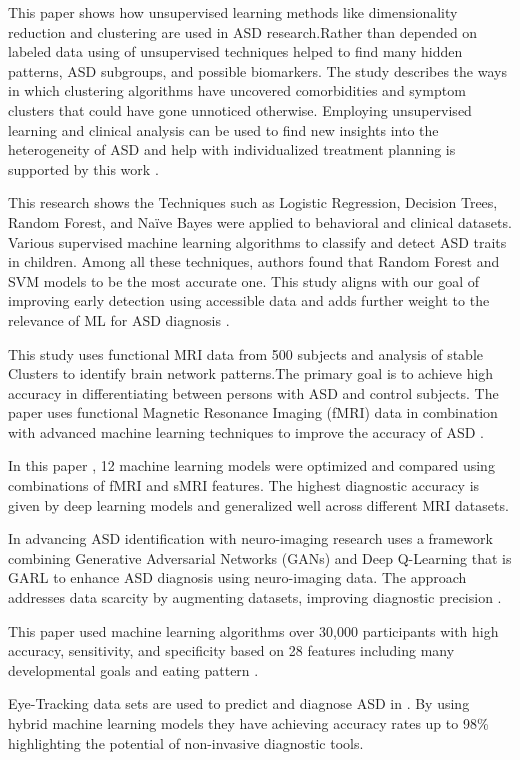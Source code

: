\documentclass[pdflatex,sn-nature]{sn-jnl}
\theoremstyle{thmstyleone}%
\theoremstyle{thmstyletwo}%
\theoremstyle{thmstylethree}%
\begin{document}
This paper shows how unsupervised learning methods like dimensionality reduction and clustering are used in ASD research.Rather than depended on labeled data using of unsupervised techniques helped to find many hidden patterns, ASD subgroups, and possible biomarkers. The study describes the ways in which clustering algorithms have uncovered comorbidities and symptom clusters that could have gone unnoticed otherwise. Employing unsupervised learning and clinical analysis can be used to find new insights into the heterogeneity of ASD and help with individualized treatment planning is supported by this work \cite{parlett2023applications}.

This research shows the Techniques such as Logistic Regression, Decision Trees, Random Forest, and Naïve Bayes were applied to behavioral and clinical datasets. Various supervised machine learning algorithms to classify and detect ASD traits in children. Among all these techniques, authors found that Random Forest and SVM models to be the most accurate one. This study aligns with our goal of improving early detection using accessible data and adds further weight to the relevance of ML for ASD diagnosis \cite{bib4}.

This study uses functional MRI data from 500 subjects and analysis of stable Clusters to identify brain network patterns.The primary goal is to achieve high accuracy in differentiating between persons with ASD and control subjects. The paper uses functional Magnetic Resonance Imaging (fMRI) data in combination with advanced machine learning techniques to improve the accuracy of ASD \cite{bib5}.

In this paper \cite{bib6}, 12 machine learning models were optimized and compared using combinations of fMRI and sMRI features. The highest diagnostic accuracy is given by deep learning models and generalized well across different MRI datasets.

In advancing ASD identification with neuro-imaging research uses a framework combining Generative Adversarial Networks (GANs) and Deep Q-Learning that is  GARL to enhance ASD diagnosis using neuro-imaging data. The approach addresses data scarcity by augmenting datasets, improving diagnostic precision \cite{bib7}.

This paper used machine learning algorithms over 30,000 participants with high accuracy, sensitivity, and specificity based on 28 features including many developmental goals and eating pattern \cite{bib8}.

Eye-Tracking data sets are used to predict and diagnose ASD in \cite{bib10}. By using hybrid machine learning models they have achieving accuracy rates up to 98\%  highlighting the potential of non-invasive diagnostic tools.
\end{document}
